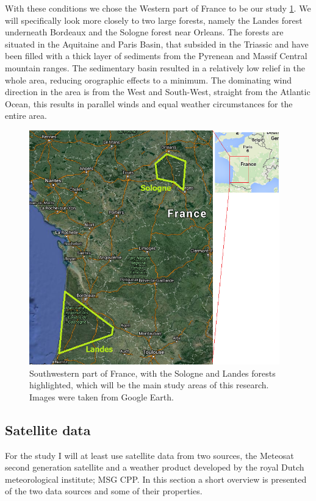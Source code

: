 \documentclass{article}
\begin{document}
With these conditions we chose the Western part of France to be our study  \ref{fig:studyarea}. We will specifically look more closely to two large forests, namely the Landes forest underneath Bordeaux and the Sologne forest near Orleans. The forests are situated in the Aquitaine and Paris Basin, that subsided in the Triassic and have been filled with a thick layer of sediments from the Pyrenean and Massif Central mountain ranges. The sedimentary basin resulted in a relatively low relief in the whole area, reducing orographic effects to a minimum. The dominating wind direction in the area is from the West and South-West, straight from the Atlantic Ocean, this results in parallel winds and equal weather circumstances for the entire area.

\begin{figure}[H]
	\centering
	\includegraphics[height=4in]{Study_area.png}
	\caption[Optional caption]{Southwestern part of France, with the Sologne and Landes forests highlighted, which will be the main study areas of this research. Images were taken from Google Earth.}
	\label{fig:studyarea}
\end{figure}


\subsection{Satellite data}
For the study I will at least use satellite data from two sources, the Meteosat second generation satellite and a weather product developed by the royal Dutch meteorological institute; MSG CPP. In this section a short overview is presented of the two data sources and some of their properties.
\end{document}
